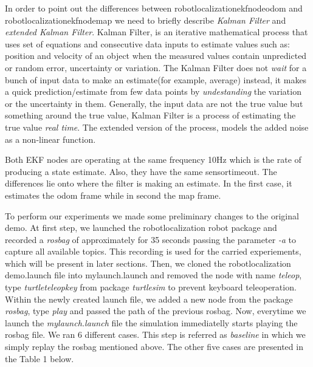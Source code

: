 \documentclass[10pt,a4paper,twocolumn]{article}
\begin{document}
In order to point out the differences between robot\textunderscore localization\textunderscore ekf\textunderscore node\textunderscore odom and robot\textunderscore localization\textunderscore ekf\textunderscore node\textunderscore map we need to briefly describe \textit{Kalman Filter} and \textit{extended Kalman Filter}. Kalman Filter, is an iterative mathematical process that uses set of equations and consecutive data inputs to estimate values such as: position and velocity of an object when the measured values contain unpredicted or random error, uncertainty or variation. The Kalman Filter does not \textit{wait} for a bunch of input data to make an estimate(for example, average) instead, it makes a quick prediction/estimate from few data points by \textit{undestanding} the variation or the uncertainty in them. Generally, the input data are not the true value but something around the true value, Kalman Filter is a process of estimating the true value \textit{real time}. The extended version of the process, models the added noise as a non-linear function.

Both EKF nodes are operating at the same frequency 10Hz which is the rate of producing a state estimate. Also, they have the same sensor\textunderscore timeout. The differences lie onto where the filter is making an estimate. In the first case, it estimates the odom frame while in second the map frame.

To perform our experiments we made some preliminary changes to the original demo. At first step, we launched the robot\textunderscore localization \textunderscore robot package and recorded a \textit{rosbag} of approximately for 35 seconds passing the parameter \textit{-a} to capture all available topics. This recording is used for the carried experiements, which will be present in later sections. Then, we cloned the robot\textunderscore localization \textunderscore demo.launch file into {mylaunch.launch} and removed the node with name \textit{teleop}, type \textit{turtle\textunderscore teleop\textunderscore key} from package \textit{turtlesim} to prevent keyboard teleoperation. Within the newly created launch file, we added a new node from the package \textit{rosbag}, type \textit{play} and passed the path of the previous rosbag. Now, everytime we launch the \textit{mylaunch.launch} file the simulation immediatelly starts playing the rosbag file. We ran 6 different cases. This step is referred as \textit{baseline} in which we simply replay the rosbag mentioned above. The other five cases are presented in the Table 1 below.
\end{document}
